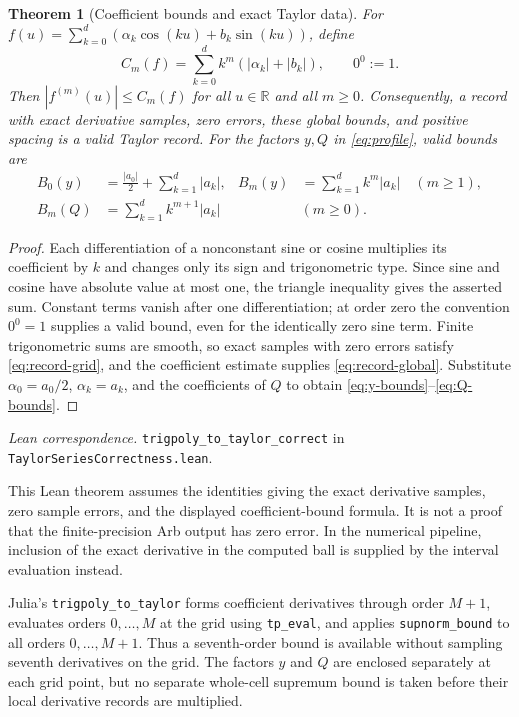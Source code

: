 \documentclass[11pt]{article}
\newtheorem{theorem}{Theorem}[section]
\theoremstyle{definition}
\theoremstyle{remark}
\newcommand{\R}{\mathbb R}
\newcommand{\code}[1]{\nolinkurl{#1}}
\newcommand{\leanref}[2]{\par\smallskip\noindent\textit{Lean correspondence.}
  \code{#1} in \code{#2}.\par\smallskip}
\numberwithin{equation}{section}
\begin{document}
\begin{theorem}[Coefficient bounds and exact Taylor data]
\label{thm:coefficients}
For $f(u)=\sum_{k=0}^{d}(\alpha_k\cos(ku)+b_k\sin(ku))$, define
\begin{equation}
 C_m(f)=\sum_{k=0}^{d}k^m(|\alpha_k|+|b_k|),\qquad0^0:=1.
\end{equation}
Then $|f^{(m)}(u)|\leq C_m(f)$ for all $u\in\R$ and all $m\geq0$.
Consequently, a record with exact derivative samples, zero errors, these
global bounds, and positive spacing is a valid Taylor record.
For the factors $y,Q$ in \eqref{eq:profile}, valid bounds are
\begin{align}
 B_0(y)&=\frac{|a_0|}{2}+\sum_{k=1}^{d}|a_k|,&
 B_m(y)&=\sum_{k=1}^{d}k^m|a_k|\quad(m\geq1),\label{eq:y-bounds}\\
 B_m(Q)&=\sum_{k=1}^{d}k^{m+1}|a_k|&& (m\geq0).
 \label{eq:Q-bounds}
\end{align}
\end{theorem}
\begin{proof}
Each differentiation of a nonconstant sine or cosine multiplies its
coefficient by $k$ and changes only its sign and trigonometric type. Since
sine and cosine have absolute value at most one, the triangle inequality
gives the asserted sum. Constant terms vanish after one differentiation;
at order zero the convention $0^0=1$ supplies a valid bound, even for the
identically zero sine term. Finite trigonometric sums are smooth, so exact
samples with zero errors satisfy \eqref{eq:record-grid}, and the coefficient
estimate supplies \eqref{eq:record-global}. Substitute
$\alpha_0=a_0/2$, $\alpha_k=a_k$, and the coefficients of $Q$ to obtain
\eqref{eq:y-bounds}--\eqref{eq:Q-bounds}.
\end{proof}
\leanref{trigpoly_to_taylor_correct}{TaylorSeriesCorrectness.lean}
This Lean theorem assumes the identities giving the exact derivative
samples, zero sample errors, and the displayed coefficient-bound formula.
It is not a proof that the finite-precision Arb output has zero error.
In the numerical pipeline, inclusion of the exact derivative in the
computed ball is supplied by the interval evaluation instead.

Julia's \code{trigpoly_to_taylor} forms coefficient derivatives through
order $M+1$, evaluates orders $0,\ldots,M$ at the grid using \code{tp_eval},
and applies \code{supnorm_bound} to all orders $0,\ldots,M+1$.
Thus a seventh-order bound is available without sampling seventh
derivatives on the grid. The factors $y$ and $Q$ are enclosed separately
at each grid point, but no separate whole-cell supremum bound is taken
before their local derivative records are multiplied.
\end{document}
